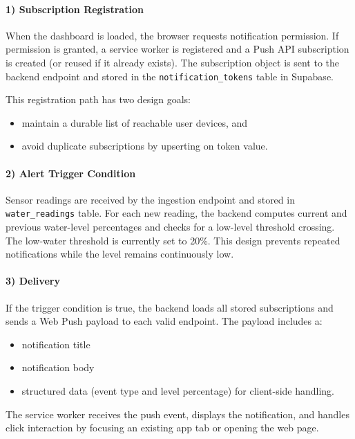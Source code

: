 \paragraph{1) Subscription Registration}

When the dashboard is loaded, the browser requests notification permission. If permission is granted, a service worker is registered and 
a Push API subscription is created (or reused if it already exists). The subscription object is sent to the backend endpoint and stored 
in the \texttt{notification\_tokens} table in Supabase.

\noindent This registration path has two design goals:
\begin{itemize}
	\item maintain a durable list of reachable user devices, and
	\item avoid duplicate subscriptions by upserting on token value.
\end{itemize}

\paragraph{2) Alert Trigger Condition}

Sensor readings are received by the ingestion endpoint and stored in \texttt{water\_readings} table. For each new reading, the backend 
computes current and previous water-level percentages and checks for a low-level threshold crossing. The low-water threshold is currently set to 20\%.
This design prevents repeated notifications while the level remains continuously low.

\paragraph{3) Delivery}

If the trigger condition is true, the backend loads all stored subscriptions and sends a Web Push payload to each valid endpoint. The payload includes a:
\begin{itemize}
	\item notification title
    \item notification body
	\item structured data (event type and level percentage) for client-side handling.
\end{itemize}

\noindent The service worker receives the push event, displays the notification, and handles click interaction by focusing an existing app tab or opening the web page.

